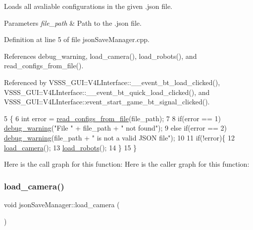 Loads all avaliable configurations in the given .json file. 


\begin{DoxyParams}{Parameters}
{\em file\+\_\+path} & Path to the .json file. \\
\hline
\end{DoxyParams}


Definition at line 5 of file json\+Save\+Manager.\+cpp.



References debug\+\_\+warning, load\+\_\+camera(), load\+\_\+robots(), and read\+\_\+configs\+\_\+from\+\_\+file().



Referenced by V\+S\+S\+S\+\_\+\+G\+U\+I\+::\+V4\+L\+Interface\+::\+\_\+\+\_\+event\+\_\+bt\+\_\+load\+\_\+clicked(), V\+S\+S\+S\+\_\+\+G\+U\+I\+::\+V4\+L\+Interface\+::\+\_\+\+\_\+event\+\_\+bt\+\_\+quick\+\_\+load\+\_\+clicked(), and V\+S\+S\+S\+\_\+\+G\+U\+I\+::\+V4\+L\+Interface\+::event\+\_\+start\+\_\+game\+\_\+bt\+\_\+signal\+\_\+clicked().


\begin{DoxyCode}
5                                                  \{
6     \textcolor{keywordtype}{int} error = \hyperlink{classjson_save_manager_a71683c4903b413a1311e5b10b519ad41}{read\_configs\_from\_file}(file\_path);
7 
8     \textcolor{keywordflow}{if}(error == 1) \hyperlink{debug_8hpp_a82185c5a131fe76d2d21364ef6db6144}{debug\_warning}(\textcolor{stringliteral}{"File "} + file\_path + \textcolor{stringliteral}{" not found"});
9     \textcolor{keywordflow}{else} \textcolor{keywordflow}{if}(error == 2) \hyperlink{debug_8hpp_a82185c5a131fe76d2d21364ef6db6144}{debug\_warning}(file\_path + \textcolor{stringliteral}{" is not a valid JSON file"});
10 
11     \textcolor{keywordflow}{if}(!error)\{
12         \hyperlink{classjson_save_manager_a6184c9f744044a5ccdf34c6386275df8}{load\_camera}();
13         \hyperlink{classjson_save_manager_a6ddf4a28c77c83f37e3771177226c960}{load\_robots}();
14     \}
15 \}
\end{DoxyCode}
Here is the call graph for this function\+:
Here is the caller graph for this function\+:
\mbox{\label{classjson_save_manager_a6184c9f744044a5ccdf34c6386275df8}} 
\subsubsection{\texorpdfstring{load\+\_\+camera()}{load\_camera()}}
{\footnotesize\ttfamily void json\+Save\+Manager\+::load\+\_\+camera (\begin{DoxyParamCaption}{ }\end{DoxyParamCaption})}



